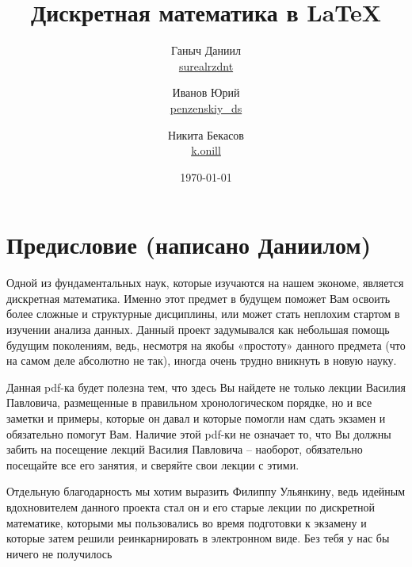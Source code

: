 \documentclass[12pt, a4paper, oneside]{article}
\author{Ганыч Даниил \\ \href{https://vk.com/surealrzdnt}{surealrzdnt} \and Иванов Юрий \\ \href{https://vk.com/penzenskiy_ds}{penzenskiy\_ds} \and Никита Бекасов \\  \href{https://vk.com/k.onill}{k.onill}}
\title{Дискретная математика в \LaTeX}
\date{\today}
\theoremstyle{plain} %
\theoremstyle{definition}
\newtheorem*{definition}{Определение}  %
\newcommand{\indef}[1]{\textbf{ \color{dark_red} #1}}
\begin{document}

\maketitle






\section*{Предисловие (написано Даниилом)}

Одной из фундаментальных наук, которые изучаются на нашем экономе, является дискретная математика. Именно этот предмет в будущем поможет Вам освоить более сложные и структурные дисциплины, или может стать неплохим стартом в изучении анализа данных. Данный проект задумывался как небольшая помощь будущим поколениям, ведь, несмотря на якобы «простоту» данного предмета (что на самом деле абсолютно не так), иногда очень трудно вникнуть в новую науку. 

Данная pdf-ка будет полезна тем, что здесь Вы найдете не только лекции Василия Павловича, размещенные в правильном хронологическом порядке, но и все заметки и примеры, которые он давал и которые помогли нам сдать экзамен и обязательно помогут Вам. Наличие этой pdf-ки не означает то, что Вы должны забить на посещение лекций Василия Павловича – наоборот, обязательно посещайте все его занятия, и сверяйте свои лекции с этими.


Отдельную благодарность мы хотим выразить Филиппу Ульянкину, ведь идейным вдохновителем данного проекта стал он и его старые лекции по дискретной математике, которыми мы пользовались во время подготовки к экзамену и которые затем решили реинкарнировать в электронном виде. Без тебя у нас бы ничего не получилось \Heart  
\end{document}
